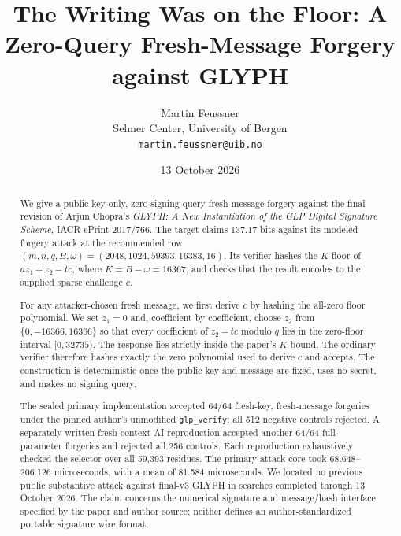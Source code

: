 \documentclass[10pt,a4paper]{article}
\title{\bfseries The Writing Was on the Floor: A Zero-Query Fresh-Message Forgery against GLYPH}
\author{Martin Feussner\\
\small Selmer Center, University of Bergen\\
\small \texttt{martin.feussner@uib.no}}
\date{13 October 2026}
\begin{document}
\maketitle

\noindent{}

\begin{abstract}
We give a public-key-only, zero-signing-query fresh-message forgery against
the final revision of Arjun Chopra's \emph{GLYPH: A New Instantiation of the
GLP Digital Signature Scheme}, IACR ePrint 2017/766.  The target claims
137.17 bits against its modeled forgery attack at the recommended row
$(m,n,q,B,\omega)=(2048,1024,59393,16383,16)$.  Its verifier hashes the
$K$-floor of $az_1+z_2-tc$, where $K=B-\omega=16367$, and checks that the
result encodes to the supplied sparse challenge $c$.

For any attacker-chosen fresh message, we first derive $c$ by hashing the
all-zero floor polynomial.  We set $z_1=0$ and, coefficient by coefficient,
choose $z_2$ from $\{0,-16366,16366\}$ so that every coefficient of
$z_2-tc$ modulo $q$ lies in the zero-floor interval $[0,32735)$.  The response
lies strictly inside the paper's $K$ bound.  The ordinary verifier therefore
hashes exactly the zero polynomial used to derive $c$ and accepts.  The
construction is deterministic once the public key and message are fixed,
uses no secret, and makes no signing query.

The sealed primary implementation accepted 64/64 fresh-key, fresh-message
forgeries under the pinned author's unmodified \texttt{glp\_verify}; all
512 negative controls rejected.  A separately written fresh-context AI
reproduction accepted another 64/64 full-parameter forgeries and rejected
all 256 controls.  Each reproduction exhaustively checked the selector over
all 59,393 residues.  The primary attack core took 68.648--206.126
microseconds, with a mean of 81.584 microseconds.  We located no previous
public substantive attack against final-v3 GLYPH in searches completed
through 13 October 2026.  The claim concerns the numerical signature and
message/hash interface specified by the paper and author source; neither
defines an author-standardized portable signature wire format.
\end{abstract}
\end{document}
